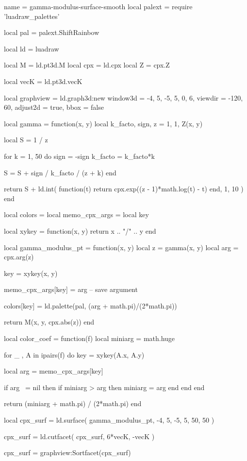 \documentclass[border = 3pt]{standalone}
\begin{document}
\begin{luadraw*}{name = gamma-modulus-surface-smooth}
local palext = require 'luadraw_palettes'

local pal = palext.ShiftRainbow

local ld = luadraw

local M   = ld.pt3d.M
local cpx = ld.cpx
local Z   = cpx.Z

local vecK = ld.pt3d.vecK

local graphview = ld.graph3d:new{
  window3d = {-4, 5, -5, 5, 0, 6},
  viewdir  = {-120, 60},
  adjust2d = true,
  bbox     = false
}

local gamma = function(x, y)
  local k_facto, sign, z = 1, 1, Z(x, y)

  local S = 1 / z

  for k = 1, 50 do
    sign    = -sign
    k_facto = k_facto*k

    S = S + sign / k_facto / (z + k)
  end

  return S + ld.int(
    function(t)
      return cpx.exp((z - 1)*math.log(t) - t)
    end,
    1, 10
  )
end

local colors        = {}
local memo_cpx_args = {}
local key

local xykey = function(x, y)
  return x .. "/" .. y
end

local gamma_modulus_pt = function(x, y)
  local z = gamma(x, y)
  local arg = cpx.arg(z)

  key = xykey(x, y)

  memo_cpx_args[key] = arg -- save argument

  colors[key] = ld.palette(pal, (arg + math.pi)/(2*math.pi))

  return M(x, y, cpx.abs(z))
end

local color_coef = function(f)
  local miniarg = math.huge

  for _ , A in ipairs(f) do
    key = xykey(A.x, A.y)

    local arg = memo_cpx_args[key]

    if arg ~= nil then
      if miniarg > arg then
        miniarg = arg
      end
    end
  end

  return (miniarg + math.pi) / (2*math.pi)
end

local cpx_surf = ld.surface(
  gamma_modulus_pt,
  -4, 5, -5, 5,
  {50, 50}
)

cpx_surf = ld.cutfacet(
  cpx_surf,
  {6*vecK, -vecK}
)

cpx_surf = graphview:Sortfacet(cpx_surf)


\end{luadraw*}
\end{document}
